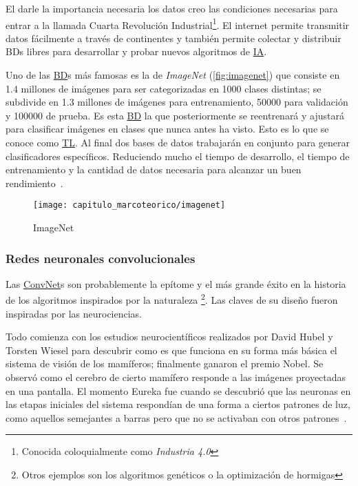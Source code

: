 El darle la importancia necesaria los datos creo las condiciones necesarias para
entrar a la llamada Cuarta Revolución Industrial\footnote{Conocida
coloquialmente como \emph{Industria 4.0}}. El internet permite transmitir datos
fácilmente a través de continentes y también permite colectar y distribuir BDs
libres para desarrollar y probar nuevos algoritmos de \hyperlink{abbr}{IA}. 

Uno de las \hyperlink{abbr}{BD}s más famosas es la de \emph{ImageNet}
(\autoref{fig:imagenet}) que consiste en 1.4 millones de imágenes para ser
categorizadas en 1000 clases distintas; se subdivide en 1.3 millones de imágenes
para entrenamiento, 50000 para validación y 100000 de prueba. Es esta
\hyperlink{abbr}{BD} la que posteriormente se reentrenará y ajustará para
clasificar imágenes en clases que nunca antes ha visto. Esto es lo que se conoce
como \hyperlink{abbr}{TL}. Al final dos bases de datos trabajarán en conjunto
para generar clasificadores específicos. Reduciendo mucho el tiempo de
desarrollo, el tiempo de entrenamiento y la cantidad de datos necesaria para
alcanzar un buen rendimiento~\cite{Russakovsky2015}.

\begin{figure}[H]
    \centering
    \texttt{[image: capitulo\_marcoteorico/imagenet]}
    \caption{ImageNet}\label{fig:imagenet}
\end{figure}


\subsubsection{Redes neuronales convolucionales}

Las \hyperlink{abbr}{ConvNet}s son probablemente la epítome y el más grande
éxito en la historia de los algoritmos inspirados por la naturaleza
\footnote{Otros ejemplos son los algoritmos genéticos o la optimización de
hormigas}. Las claves de su diseño fueron inspiradas por las neurociencias.

Todo comienza con los estudios neurocientíficos realizados por David Hubel y
Torsten Wiesel para descubrir como es que funciona en su forma más básica el
sistema de visión de los mamíferos; finalmente ganaron el premio Nobel. Se
observó como el cerebro de cierto mamífero responde a las imágenes proyectadas
en una pantalla. El momento Eureka fue cuando se descubrió que las neuronas en
las etapas iniciales del sistema respondían de una forma a ciertos patrones de
luz, como aquellos semejantes a barras pero que no se activaban con otros
patrones~\cite{Learningb}.

